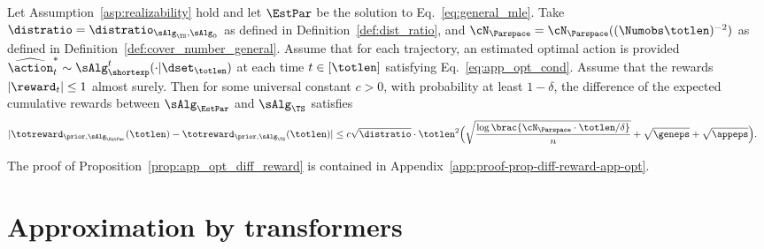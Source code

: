 \documentclass[10pt]{article}
\begin{document}
\begin{proposition}\label{prop:app_opt_diff_reward} Let Assumption~\ref{asp:realizability} hold and let $\EstPar$ be the solution to Eq.~\eqref{eq:general_mle}. Take $\distratio = \distratio_{\sAlg_\TS,\sAlg_0}$ as defined in Definition~\ref{def:dist_ratio}, and $\cN_{\Parspace} = \cN_{\Parspace}((\Numobs\totlen)^{-2})$  as defined in Definition~\ref{def:cover_number_general}. Assume that for each trajectory, an estimated optimal action is provided $\widehat\action_t^* \sim \sAlg_{\shortexp}^t(\cdot | \dset_\totlen)$ at each time $t\in[\totlen]$ satisfying Eq.~\eqref{eq:app_opt_cond}. 
Assume that the rewards $|\reward_t|\leq 1$  almost surely. Then for some universal constant $c>0$, with probability at least $1-\delta$, the difference of the expected cumulative rewards between $\sAlg_\EstPar$ and $\sAlg_\TS$ satisfies 
\begin{align*}
|\totreward_{\prior,\sAlg_\EstPar}(\totlen)-\totreward_{\prior,\sAlg_\TS}(\totlen)|
&\leq 
c \sqrt{\distratio}\cdot\totlen^2 \Big( \sqrt{\frac{\log \brac{ \cN_{\Parspace} \cdot \totlen/\delta } }{n} } + \sqrt{\geneps} + \sqrt{\appeps} \Big). 
\end{align*}
\end{proposition}
The proof of Proposition~\ref{prop:app_opt_diff_reward} is contained in Appendix~\ref{app:proof-prop-diff-reward-app-opt}. 






\section{Approximation by transformers}\label{sec:ICRL}
\end{document}
